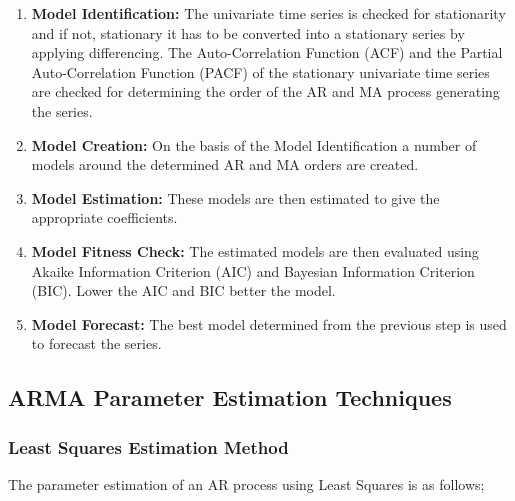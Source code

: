 \documentclass[journal]{IEEEtran}
\begin{document}
\begin{enumerate}

  \item \textbf{Model Identification:} The univariate time series is checked for stationarity and if not, stationary it has to be converted into a stationary series by applying differencing. The Auto-Correlation Function (ACF) and the Partial Auto-Correlation Function (PACF) of the stationary univariate time series are checked for determining the order of the AR and MA process generating the series.
  \item \textbf{Model Creation:} On the basis of the Model Identification a number of models around the determined AR and MA orders are created.
  \item \textbf{Model Estimation:} These models are then estimated to give the appropriate coefficients.
  \item \textbf{Model Fitness Check:} The estimated models are then evaluated using Akaike Information Criterion (AIC) and Bayesian Information Criterion (BIC). Lower the AIC and BIC better the model.
  \item \textbf{Model Forecast:} The best model determined from the previous step is used to forecast the series.


\end{enumerate}



\subsection{ARMA Parameter Estimation Techniques}



\subsubsection{Least Squares Estimation Method}

The parameter estimation of an AR process using Least Squares is as follows;
\end{document}
